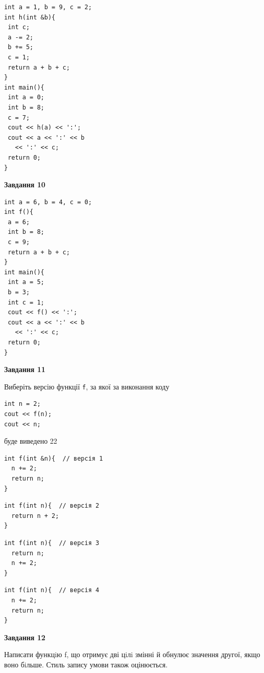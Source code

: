 \documentclass[12pt, ukrainian]{article}
\def\code#1{\Verb!#1!}
\begin{document}
{\begin {large}
\begin{minipage}[t]{7.0cm}
\begin{verbatim}
int a = 1, b = 9, c = 2;
int h(int &b){
 int c;
 a -= 2;
 b += 5;
 c = 1;
 return a + b + c;
}
int main(){
 int a = 0;
 int b = 8;
 c = 7;
 cout << h(a) << ':';
 cout << a << ':' << b 
   << ':' << c;
 return 0;
}
\end{verbatim}



\begin{center}
\textbf{Завдання 10}
\end{center}
\vspace{-8mm}

\begin{verbatim}
int a = 6, b = 4, c = 0;
int f(){
 a = 6;
 int b = 8;
 c = 9;
 return a + b + c;
}
int main(){
 int a = 5;
 b = 3;
 int c = 1;
 cout << f() << ':';
 cout << a << ':' << b 
   << ':' << c;
 return 0;
}
\end{verbatim}

\end{minipage}
\vline \hspace{1mm}
\begin{minipage}[t]{11.0cm}

\begin{center}
\textbf{Завдання 11}
\end{center}
Виберіть версію функції \code{f}, за якої за виконання коду
\begin{verbatim}
int n = 2;
cout << f(n);
cout << n;
\end{verbatim}

буде виведено 22

\begin{verbatim}
int f(int &n){  // версія 1
  n += 2;
  return n;
}
\end{verbatim}

\vspace{-8mm}\begin{verbatim}
int f(int n){  // версія 2
  return n + 2;
}
\end{verbatim}

\vspace{-8mm}\begin{verbatim}
int f(int n){  // версія 3
  return n;
  n += 2;
}
\end{verbatim}

\vspace{-8mm}\begin{verbatim}
int f(int n){  // версія 4
  n += 2;
  return n;
}
\end{verbatim}



\begin{center}
\textbf{Завдання 12}
\end{center}

Написати функцiю f, що отримує дві цiлi змінні й обнулює значення другої, якщо воно бiльше. Стиль запису умови також оцінюється.\par

\end{minipage}

\end {large}}
\newpage
\end{document}

